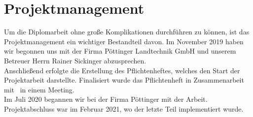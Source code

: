 \chapter{Projektmanagement}
Um die Diplomarbeit ohne große Komplikationen durchführen zu können, ist das Projektmanagement ein wichtiger Bestandteil davon. Im November 2019 haben wir begonnen uns mit der Firma Pöttinger Landtechnik GmbH und unserem Betreuer Herrn Rainer Sickinger abzusprechen.\\
Anschließend erfolgte die Erstellung des Pflichtenheftes, welches den Start der Projektarbeit darstellte. Finalisiert wurde das Pflichtenheft in Zusammenarbeit mit \ThPartnerPersonName \, in einem Meeting.\\
Im Juli 2020 begannen wir bei der Firma Pöttinger mit der Arbeit. Projektabschluss war im Februar 2021, wo der letzte Teil implementiert wurde.

